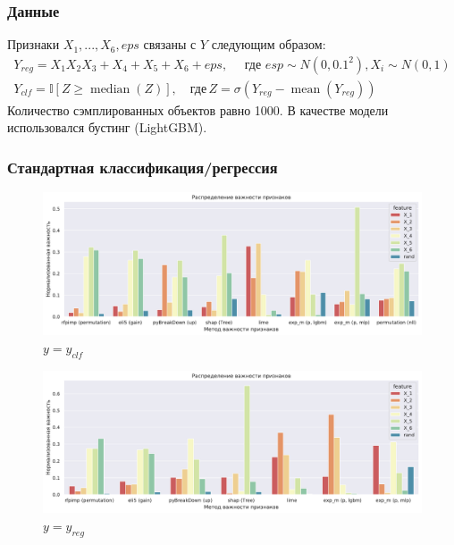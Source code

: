 \documentclass[12pt]{article}
\begin{document}
\subsubsection{Данные}
Признаки $X_1, ... , X_6, eps$ связаны с $Y$ следующим образом:
\begin{gather*}
    Y_{r e g}=X_{1} X_{2} X_{3}+X_{4}+X_{5}+X_{6}+e p s, \hspace{1em}\text { где } e s p \sim N\left(0,0.1^{2}\right), X_{i} \sim N(0,1)\\
    Y_{c l f}= \mathbb{I}[Z \geq \operatorname{median}(Z)], \hspace{1em}\text{где} \, Z = \sigma\left(Y_{r e g}-\operatorname{mean}\left(Y_{r e g}\right)\right)
\end{gather*}
Количество сэмплированных объектов равно 1000.
В качестве модели использовался бустинг (LightGBM).

\subsubsection{Стандартная классификация/регрессия}
\begin{figure}[h]
\centering
\includegraphics[width=\textwidth]{images/at2_setup1.pdf}
\caption{$y=y_{clf}$}
\end{figure}

\begin{figure}[h]
\centering
\includegraphics[width=\textwidth]{images/at2_setup3.pdf}
\caption{$y=y_{reg}$}
\end{figure}
\end{document}
